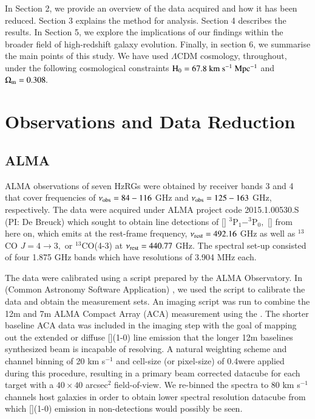 In Section 2, we provide an overview of the data acquired and how it has been reduced. Section 3 explains the method for analysis. Section 4 describes the results. In Section 5, we explore the implications of our findings within the broader field of high-redshift galaxy evolution. Finally, in section 6, we summarise the main points of this study. We have used \citet{Planck2016} $\Lambda$CDM cosmology, throughout, under the following cosmological constraints $\rm H_0 = 67.8~km~s^{-1}~Mpc^{-1}$ and $\rm \Omega_m = 0.308.$ 

\section{Observations and Data Reduction}
\subsection{ALMA}
ALMA observations of seven HzRGs were obtained by receiver bands 3 and 4 that cover frequencies of $\nu_{\rm obs}=84 - 116$ GHz and $\nu_{\rm obs}=125 - 163$ GHz, respectively. The data were acquired under ALMA project code 2015.1.00530.S (PI: De Breuck) which sought to obtain line detections of [] $^3$P$_1 - ^3$P$_0,$ [] from here on, which emits at the rest-frame frequency, $\nu_{\rm rest} = 492.16$ GHz as well as $^{13}$CO $J=4 \rightarrow 3,$ or $^{13}$CO(4-3) at $\nu_{\rm rest} = 440.77$ GHz. The spectral set-up consisted of four 1.875 GHz bands which have resolutions of 3.904 MHz each.

The data were calibrated using a script prepared by the ALMA Observatory. In  (Common Astronomy Software Application) \citep{mcmullin2007}, we used the script to calibrate the data and obtain the measurement sets. An imaging script was run to combine the 12m and 7m ALMA Compact Array (ACA) measurement using the  . The shorter baseline ACA data was included in the imaging step with the goal of mapping out the extended or diffuse [](1-0) line emission that the longer 12m baselines synthesized beam is incapable of resolving. A natural weighting scheme and channel binning of 20 km s$^{-1}$ and cell-size (or pixel-size) of 0.4\arcsec were applied during this procedure, resulting in a primary beam corrected datacube for each target with a $40 \times 40$ arcsec$^2$ field-of-view. We re-binned the spectra to 80 km s$^{-1}$ channels host galaxies in order to obtain lower spectral resolution datacube from which [](1-0) emission in non-detections would possibly be seen. 

